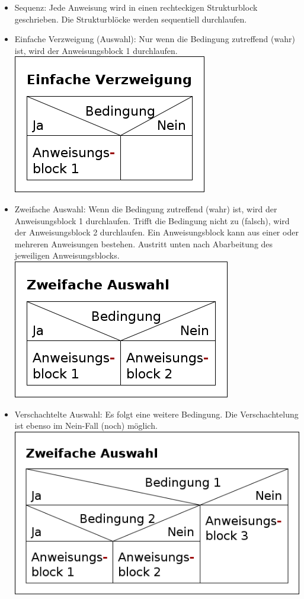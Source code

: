 \begin{itemize}
	\item Sequenz: Jede Anweisung wird in einen rechteckigen Strukturblock geschrieben. Die Strukturblöcke werden sequentiell durchlaufen.\\
	\item Einfache Verzweigung (Auswahl): Nur wenn die Bedingung zutreffend (wahr) ist, wird der Anweisungsblock 1 durchlaufen.\\
\includegraphics[scale=0.5]{pictures/lf06prog-pic/lf06prog-einfache-auswahl-struct.png}
	\item Zweifache Auswahl: Wenn die Bedingung zutreffend (wahr) ist, wird der Anweisungsblock 1 durchlaufen. Trifft die Bedingung nicht zu (falsch), wird der Anweisungsblock 2 durchlaufen. Ein Anweisungsblock kann aus einer oder mehreren Anweisungen bestehen. Austritt unten nach Abarbeitung des jeweiligen Anweisungsblocks.\\
\includegraphics[scale=0.5]{pictures/lf06prog-pic/lf06prog-zweifache-auswahl-struct.png}
	\item Verschachtelte Auswahl: Es folgt eine weitere Bedingung. Die Verschachtelung ist ebenso im Nein-Fall (noch) möglich.\\
\includegraphics[scale=0.5]{pictures/lf06prog-pic/lf06prog-verschachtelte-auswahl-struct.png}

\end{itemize}
